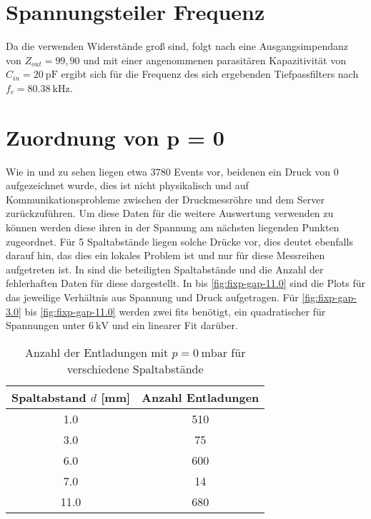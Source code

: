 \section{Spannungsteiler Frequenz}
Da die verwenden Widerstände groß sind, folgt nach  eine Ausgangsimpendanz von \(Z_{out} = 99,90\) und mit einer angenommenen parasitären Kapazitivität von \(C_{in} = \SI{20}{\pico\farad}\) ergibt sich für die Frequenz des sich ergebenden Tiefpassfilters nach  \(f_c = \SI{80,38}{\kilo\hertz}\).

\section{Zuordnung von p = 0}
\label{sec:pressurenull}
Wie in  und  zu sehen liegen etwa \(3780\) Events vor, beidenen ein Druck von 0 aufgezeichnet wurde, dies ist nicht physikalisch und auf Kommunikationsprobleme zwischen der Druckmessröhre und dem Server zurückzuführen. Um diese Daten für die weitere Auswertung verwenden zu können werden diese ihren in der Spannung am nächsten liegenden Punkten zugeordnet. Für 5 Spaltabstände liegen solche Drücke vor, dies deutet ebenfalls darauf hin, das dies ein lokales Problem ist und nur für diese Messreihen aufgetreten ist. In  sind die beteiligten Spaltabstände und die Anzahl der fehlerhaften Daten für diese dargestellt. In  bis \ref{fig:fixp-gap-11.0} sind die Plots für das jeweilige Verhältnis aus Spannung und Druck aufgetragen. Für \ref{fig:fixp-gap-3.0} bis \ref{fig:fixp-gap-11.0} werden zwei fits benötigt, ein quadratischer für Spannungen unter \(\SI{6}{\kilo\volt}\) und ein linearer Fit darüber.

\begin{table}[H]
\centering
\caption{Anzahl der Entladungen mit \(p = \SI{0}{\milli\bar}\) für verschiedene Spaltabstände}
\label{tab:updated-discharges}
\begin{tabular}{S[table-format=2.1] S[table-format=3.0]}
\toprule
\textbf{Spaltabstand \(d\) [\si{\milli\meter}]} & \textbf{Anzahl Entladungen} \\
  & 510 \\
3.0  & 75  \\
6.0  & 600 \\
7.0  & 14  \\
11.0 & 680 \\
\bottomrule
\end{tabular}
\end{table}

